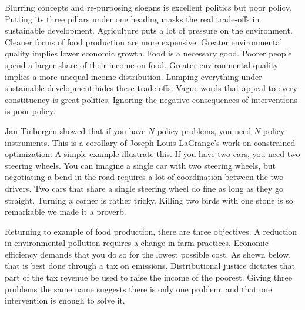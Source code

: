 Blurring concepts and re-purposing slogans is excellent politics but poor policy. Putting its three pillars under one heading masks the real trade-offs in sustainable development. Agriculture puts a lot of pressure on the environment. Cleaner forms of food production are more expensive. Greater environmental quality implies lower economic growth. Food is a necessary good. Poorer people spend a larger share of their income on food. Greater environmental quality implies a more unequal income distribution. Lumping everything under sustainable development hides these trade-offs. Vague words that appeal to every constituency is great politics. Ignoring the negative consequences of interventions is poor policy.

Jan Tinbergen showed that if you have $N$ policy problems, you need $N$ policy instruments. This is a corollary of Joseph-Louis LaGrange's work on constrained optimization. A simple example illustrate this. If you have two cars, you need two steering wheels. You can imagine a single car with two steering wheels, but negotiating a bend in the road requires a lot of coordination between the two drivers. Two cars that share a single steering wheel do fine as long as they go straight. Turning a corner is rather tricky. Killing two birds with one stone is so remarkable we made it a proverb.

Returning to example of food production, there are three objectives. A reduction in environmental pollution requires a change in farm practices. Economic efficiency demands that you do so for the lowest possible cost. As shown below, that is best done through a tax on emissions. Distributional justice dictates that part of the tax revenue be used to raise the income of the poorest. Giving three problems the same name suggests there is only one problem, and that one intervention is enough to solve it.